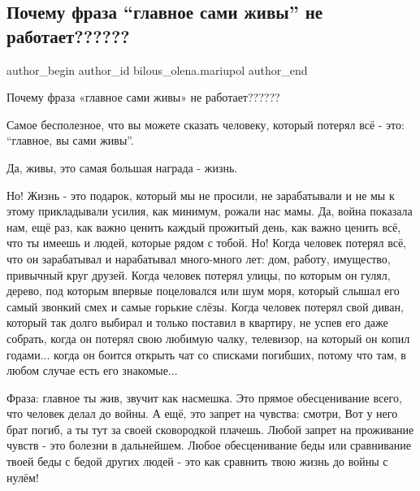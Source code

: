  
 
 
 
 

\subsection{Почему фраза \enquote{главное сами живы} не работает??????}
\label{sec:07_05_2022.fb.bilous_olena.mariupol.1.pochemu_fraza_glavnoe_sami_zhivy_ne_rabotaet}

\ifcmt
 author_begin
   author_id bilous_olena.mariupol
 author_end
\fi

Почему фраза «главное сами живы» не работает??????

Самое бесполезное, что вы можете сказать человеку, который потерял всё - это:
\enquote{главное, вы сами живы}. 

Да, живы, это самая большая награда - жизнь. 

Но! Жизнь - это подарок, который мы не просили, не зарабатывали и не мы к этому
прикладывали усилия, как минимум, рожали нас мамы. Да, война показала нам, ещё
раз, как важно ценить каждый прожитый день, как важно ценить всё, что ты имеешь
и людей, которые рядом с тобой. Но! Когда человек потерял всё, что он
зарабатывал и нарабатывал много-много лет: дом, работу, имущество, привычный
круг друзей. Когда человек потерял улицы, по которым он гулял, дерево, под
которым впервые поцеловался или шум моря, который слышал его самый звонкий смех
и самые горькие слёзы. Когда человек потерял свой диван, который так долго
выбирал и только поставил в квартиру, не успев его даже собрать, когда он
потерял свою любимую чалку, телевизор, на который он копил годами... когда он
боится открыть чат со списками погибших, потому что там, в любом случае есть
его знакомые...

Фраза: главное ты жив, звучит как насмешка. Это прямое обесценивание всего, что
человек делал до войны. А ещё, это запрет на чувства: смотри, Вот у него брат
погиб, а ты тут за своей сковородкой плачешь. Любой запрет на проживание чувств
- это болезни в дальнейшем. Любое обесценивание беды или сравнивание твоей беды
с бедой других людей - это как сравнить твою жизнь до войны с нулём!

